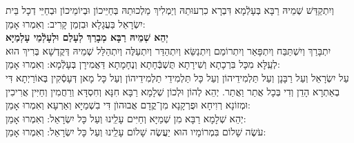 \documentclass[twoside, openany, parskip=half, 11pt]{book}
\begin{document}
\begin{kaddish}

 וְיִתְקַדַּשׁ שְׁמֵיהּ רַבָּא בְּעָלְֿמָא דִּבְרָא כִרְעוּתֵהּ
וְיַמְלִיךְ מַלְכוּתֵהּ בְּחַיֵּיכוֹן וּבְיוֹמֵיכוֹן וּבְחַיֵּי דְכָל בֵּית יִשְׂרָאֵל בַּעֲגָלָא וּבִזְמַן קָרִיב: וְאִמְרוּ אָמֵן: \\
\textbf{יְהֵא שְׁמֵיהּ רַבָּא מְבָרַךְ לְעָלַם וּלְעָלְֿמֵי עָלְמַיָּא}\\
 יִתְבָּרַךְ וְיִשְׁתַּבַּח וְיִתְפָּאַר וְיִתְרוֹמַם וְיִתְנַשֵּׂא 
וְיִתְהַדַּר וְיִתְעַלֶּה וְיִתְהַלַּל שְׁמֵיהּ דְּקֻדְשָׁא בְּרִיךְ הוּא 
לְעֵֽלָּא מִכָּל בִּרְכָתָא וְשִׁירָתָא תֻּשְׁבְּֿחָתָא וְנֶחָמָתָא 
דַּאֲמִירָן בְּעָלְֿמָא: וְאִמְרוּ אָמֵן:\\
עַל יִשְׂרָאֵל וְעַל רַבָּנָן וְעַל תַּלְמִידֵיהוֹן וְעַל כָּל תַּלְמִידֵי תַלְמִידֵיהוֹן וְעַל כָּל מָאן דְּעָסְֿקִין בְּאוֹרַיְתָא דִּי בְאַתְרָא הָדֵן וְדִי בְּכָל אֲתַר וַאֲתַר. יְהֵא לְהוֹן וּלְכוֹן שְׁלָמָא רַבָּא חִנָּא וְחִסְדָּא וְרַחֲמִין וְחַיִּין אֲרִיכִין וּמְזוֹנָא רְוִיחָא וּפֻרְקָנָא מִן־קֳדָם אֲבוּהוׂן דִּי בִשְׁמַיָּא וְאַרְעָא וְאִמְרוּ אָמֵן:\\
יְהֵא שְׁלָמָא רַבָּא מִן שְׁמַיָּא וְחַיִּים עָלֵֽינוּ וְעַל כָּל יִשְׂרָאֵל: וְאִמְרוּ אָמֵן:\\
עֹשֶׂה שָׁלוֹם בִּמְרוֹמָיו הוּא יַעֲשֶׂה שָׁלוֹם עָלֵֽינוּ וְעַל כָּל יִשְׂרָאֵל: וְאִמְרוּ אָמֵן:
\end{kaddish}

\vfill
{}\quad{}\quad{}
\end{document}
